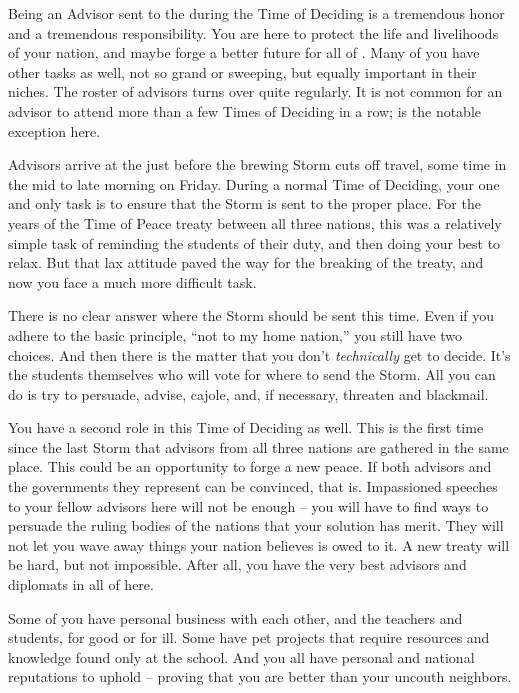 \documentclass[blue]{GL2020}
\begin{document}
\name{\bAdvisorBlue{}}

Being an Advisor sent to the \pSchool{} during the Time of Deciding is a tremendous honor and a tremendous responsibility. You are here to protect the life and livelihoods of your nation, and maybe forge a better future for all of \pEarth{}. Many of you have other tasks as well, not so grand or sweeping, but equally important in their niches. The roster of advisors turns over quite regularly. It is not common for an advisor to attend more than a few Times of Deciding in a row; \cDiplomat{} is the notable exception here.

Advisors arrive at the \pSc{} just before the brewing Storm cuts off travel, some time in the mid to late morning on Friday. During a normal Time of Deciding, your one and only task is to ensure that the Storm is sent to the proper place. For the years of the Time of Peace treaty between all three nations, this was a relatively simple task of reminding the students of their duty, and then doing your best to relax. But that lax attitude paved the way for the breaking of the treaty, and now you face a much more difficult task.

There is no clear answer where the Storm should be sent this time. Even if you adhere to the basic principle, ``not to my home nation,'' you still have two choices. And then there is the matter that you don't \emph{technically} get to decide. It's the students themselves who will vote for where to send the Storm. All you can do is try to persuade, advise, cajole, and, if necessary, threaten and blackmail.

You have a second role in this Time of Deciding as well. This is the first time since the last Storm that advisors from all three nations are gathered in the same place. This could be an opportunity to forge a new peace. If both advisors and the governments they represent can be convinced, that is. Impassioned speeches to your fellow advisors here will not be enough -- you will have to find ways to persuade the ruling bodies of the nations that your solution has merit. They will not let you wave away things your nation believes is owed to it. A new treaty will be hard, but not impossible. After all, you have the very best advisors and diplomats in all of \pEarth{} here.

Some of you have personal business with each other, and the teachers and students, for good or for ill. Some have pet projects that require resources and knowledge found only at the school. And you all have personal and national reputations to uphold -- proving that you are better than your uncouth neighbors.
\end{document}
